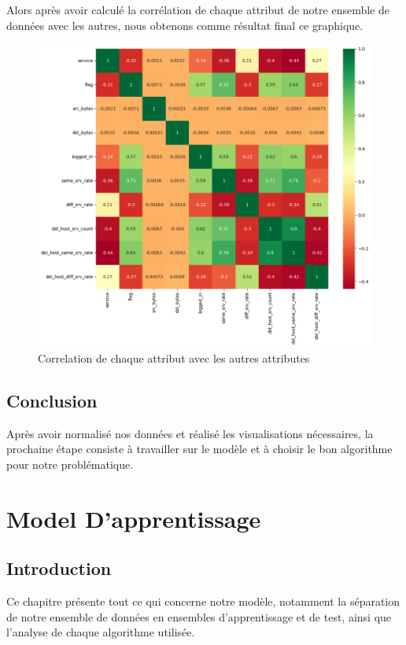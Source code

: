 \documentclass[a4paper,12pt]{report}
\begin{document}
\noindent\normalsize Alors après avoir calculé la corrélation de chaque attribut de notre ensemble de données avec les autres, nous obtenons comme résultat final ce graphique.
\begin{figure}[H]
\centering
 \includegraphics[scale=0.6]{outils-images/graphs/g5.png}
\caption{Correlation de chaque attribut avec les autres attributes}
\end{figure} 

\section{Conclusion}
\noindent\normalsize Après avoir normalisé nos données et réalisé les visualisations nécessaires, la prochaine étape consiste à travailler sur le modèle et à choisir le bon algorithme pour notre problématique.



\renewcommand{\chaptername}{Chapter}
\chapter{Model D'apprentissage}

\newpage
\pagestyle{plain} 
\section{Introduction}
\noindent \normalsize 
Ce chapitre présente tout ce qui concerne notre modèle, notamment la séparation de notre ensemble de données en ensembles d'apprentissage et de test, ainsi que l'analyse de chaque algorithme utilisée.
\end{document}
